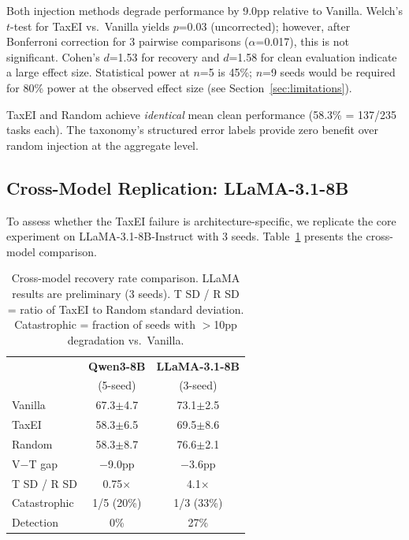 \documentclass[11pt]{article}
\begin{document}
Both injection methods degrade performance by 9.0pp relative to Vanilla.
Welch's $t$-test for TaxEI vs.\ Vanilla yields $p$=0.03 (uncorrected); however, after Bonferroni correction for 3 pairwise comparisons ($\alpha$=0.017), this is not significant.
Cohen's $d$=1.53 for recovery and $d$=1.58 for clean evaluation indicate a large effect size.
Statistical power at $n$=5 is 45\%; $n$=9 seeds would be required for 80\% power at the observed effect size (see Section~\ref{sec:limitations}).

TaxEI and Random achieve \emph{identical} mean clean performance (58.3\% = 137/235 tasks each).
The taxonomy's structured error labels provide zero benefit over random injection at the aggregate level.

\subsection{Cross-Model Replication: LLaMA-3.1-8B}
\label{sec:cross-model}

To assess whether the TaxEI failure is architecture-specific, we replicate the core experiment on LLaMA-3.1-8B-Instruct with 3 seeds.
Table~\ref{tab:cross-model} presents the cross-model comparison.

\begin{table}[t]
\centering
\small
\begin{tabular}{lcc}
\toprule
& \textbf{Qwen3-8B} & \textbf{LLaMA-3.1-8B} \\
& (5-seed) & (3-seed) \\
\midrule
Vanilla  & 67.3\scriptsize{$\pm$4.7} & 73.1\scriptsize{$\pm$2.5} \\
TaxEI    & 58.3\scriptsize{$\pm$6.5} & 69.5\scriptsize{$\pm$8.6} \\
Random   & 58.3\scriptsize{$\pm$8.7} & 76.6\scriptsize{$\pm$2.1} \\
\midrule
V$-$T gap & $-$9.0pp & $-$3.6pp \\
T SD / R SD & 0.75$\times$ & 4.1$\times$ \\
Catastrophic & 1/5 (20\%) & 1/3 (33\%) \\
Detection & 0\% & 27\% \\
\bottomrule
\end{tabular}
\caption{Cross-model recovery rate comparison. LLaMA results are preliminary (3 seeds). T SD / R SD = ratio of TaxEI to Random standard deviation. Catastrophic = fraction of seeds with $>$10pp degradation vs.\ Vanilla.}
\label{tab:cross-model}
\end{table}
\end{document}
